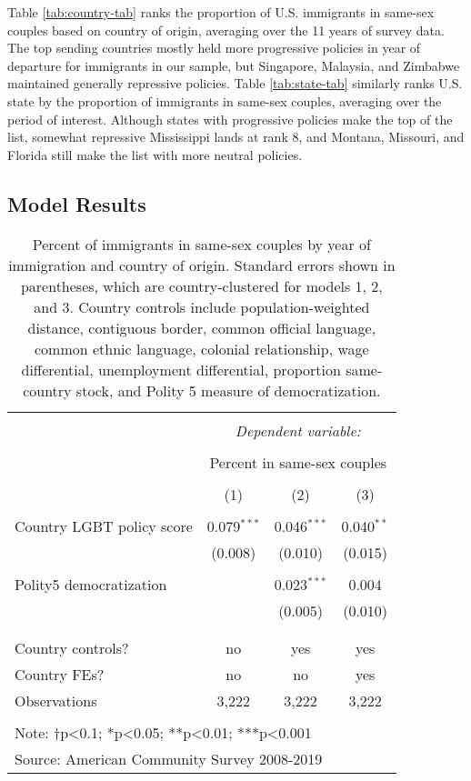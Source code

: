 \documentclass[
  11pt,
]{article}
\begin{document}
Table \ref{tab:country-tab} ranks the proportion of U.S. immigrants in same-sex couples based on country of origin, averaging over the 11 years of survey data. The top sending countries mostly held more progressive policies in year of departure for immigrants in our sample, but Singapore, Malaysia, and Zimbabwe maintained generally repressive policies. Table \ref{tab:state-tab} similarly ranks U.S. state by the proportion of immigrants in same-sex couples, averaging over the period of interest. Although states with progressive policies make the top of the list, somewhat repressive Mississippi lands at rank 8, and Montana, Missouri, and Florida still make the list with more neutral policies.

\hypertarget{model-results}{%
\subsection{Model Results}\label{model-results}}

\begin{table}[!htbp] \centering 
  \caption{Percent of immigrants in same-sex couples by year of immigration and country of origin. Standard errors shown in parentheses, which are country-clustered for models 1, 2, and 3. Country controls include population-weighted distance, contiguous border, common official language, common ethnic language, colonial relationship, wage differential, unemployment differential, proportion same-country stock, and Polity 5 measure of democratization.} 
  \label{tab:country-props} 
\begin{tabular}{@{\extracolsep{5pt}}lccc} 
\\[-1.8ex]\hline 
\hline \\[-1.8ex] 
 & \multicolumn{3}{c}{\textit{Dependent variable:}} \\ 
\cline{2-4} 
\\[-1.8ex] & \multicolumn{3}{c}{Percent in same-sex couples} \\ 
\\[-1.8ex] & (1) & (2) & (3)\\ 
\hline \\[-1.8ex] 
 Country LGBT policy score & 0.079$^{***}$ & 0.046$^{***}$ & 0.040$^{**}$ \\ 
  & (0.008) & (0.010) & (0.015) \\ 
  & & & \\ 
 Polity5 democratization &  & 0.023$^{***}$ & 0.004 \\ 
  &  & (0.005) & (0.010) \\ 
  & & & \\ 
\hline \\[-1.8ex] 
Country controls? & no & yes & yes \\ 
Country FEs? & no & no & yes \\ 
Observations & 3,222 & 3,222 & 3,222 \\ 
\hline 
\hline \\[-1.8ex] 
\multicolumn{4}{l}{Note: †p<0.1; *p<0.05; **p<0.01; ***p<0.001} \\ 
\multicolumn{4}{l}{Source: American Community Survey 2008-2019} \\ 
\end{tabular} 
\end{table}
\end{document}
